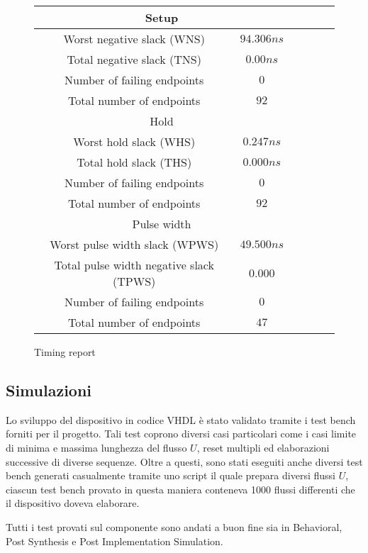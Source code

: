 \begin{figure}[!ht]
    \centering
    \begin{tabular}{|c|c|c|c|c|c|}
        \hline
        \multicolumn{2}{|c|}{Setup}                          \\
        \hline
        Worst negative slack (WNS)              & $94.306ns$ \\
        \hline
        Total negative slack (TNS)              & $0.00ns$   \\
        \hline
        Number of failing endpoints             & $0$        \\
        \hline
        Total number of endpoints               & $92$       \\
        \hline
        \multicolumn{2}{|c|}{Hold}                           \\
        \hline
        Worst hold slack (WHS)                  & $0.247ns$  \\
        \hline
        Total hold slack (THS)                  & $0.000ns$  \\
        \hline
        Number of failing endpoints             & $0$        \\
        \hline
        Total number of endpoints               & $92$       \\
        \hline
        \multicolumn{2}{|c|}{Pulse width}                    \\
        \hline
        Worst pulse width slack (WPWS)          & $49.500ns$ \\
        \hline
        Total pulse width negative slack (TPWS) & $0.000$    \\
        \hline
        Number of failing endpoints             & $0$        \\
        \hline
        Total number of endpoints               & $47$       \\
        \hline
    \end{tabular}
    \caption{Timing report}
    \label{table:timingreport}
\end{figure}

\subsection{Simulazioni}

Lo sviluppo del dispositivo in codice VHDL è stato validato tramite i test bench forniti per il progetto. Tali test coprono diversi casi particolari come i casi limite di minima e massima lunghezza del flusso $U$, reset multipli ed elaborazioni successive di diverse sequenze. Oltre a questi, sono stati eseguiti anche diversi test bench generati casualmente tramite uno script il quale prepara diversi flussi $U$, ciascun test bench provato in questa maniera conteneva 1000 flussi differenti che il dispositivo doveva elaborare.

Tutti i test provati sul componente sono andati a buon fine sia in Behavioral, Post Synthesis e Post Implementation Simulation.